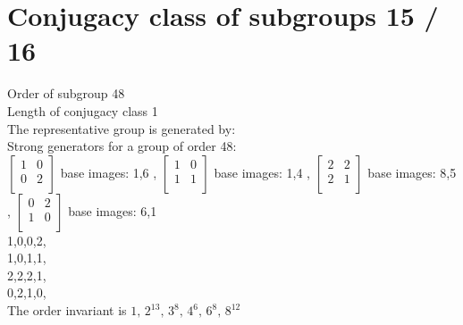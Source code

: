 \section{Conjugacy class of subgroups 15 / 16}
Order of subgroup 48\\
Length of conjugacy class 1\\
The representative group is generated by:\\
Strong generators for a group of order 48:\\
$
\left[
\begin{array}{*{2}{r}}
1 & 0\\
0 & 2\\
\end{array}
\right]
$
base images: 1,6 , 
$
\left[
\begin{array}{*{2}{r}}
1 & 0\\
1 & 1\\
\end{array}
\right]
$
base images: 1,4 , 
$
\left[
\begin{array}{*{2}{r}}
2 & 2\\
2 & 1\\
\end{array}
\right]
$
base images: 8,5 , 
$
\left[
\begin{array}{*{2}{r}}
0 & 2\\
1 & 0\\
\end{array}
\right]
$
base images: 6,1 \\
1,0,0,2,\\
1,0,1,1,\\
2,2,2,1,\\
0,2,1,0,\\
The order invariant is $1,\,2^{13},\,3^8,\,4^6,\,6^8,\,8^{12}$\\
